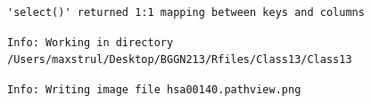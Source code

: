 \documentclass[
  letterpaper,
  DIV=11,
  numbers=noendperiod]{scrartcl}
\newenvironment{Shaded}{\begin{snugshade}}{\end{snugshade}}
\newcommand{\AttributeTok}[1]{\textcolor[rgb]{0.40,0.45,0.13}{#1}}
\newcommand{\CommentTok}[1]{\textcolor[rgb]{0.37,0.37,0.37}{#1}}
\newcommand{\ConstantTok}[1]{\textcolor[rgb]{0.56,0.35,0.01}{#1}}
\newcommand{\FunctionTok}[1]{\textcolor[rgb]{0.28,0.35,0.67}{#1}}
\newcommand{\NormalTok}[1]{\textcolor[rgb]{0.00,0.23,0.31}{#1}}
\newcommand{\OtherTok}[1]{\textcolor[rgb]{0.00,0.23,0.31}{#1}}
\newcommand{\SpecialCharTok}[1]{\textcolor[rgb]{0.37,0.37,0.37}{#1}}
\begin{document}
\begin{verbatim}
'select()' returned 1:1 mapping between keys and columns
\end{verbatim}

\begin{verbatim}
Info: Working in directory /Users/maxstrul/Desktop/BGGN213/Rfiles/Class13/Class13
\end{verbatim}

\begin{verbatim}
Info: Writing image file hsa00140.pathview.png
\end{verbatim}

\begin{Shaded}
\end{Shaded}
\end{document}
